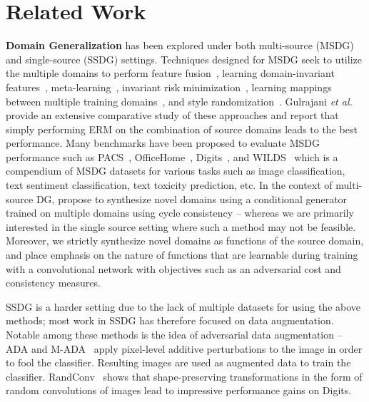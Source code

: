 \section{Related Work}
\textbf{Domain Generalization}
has been explored under both multi-source (MSDG) and single-source (SSDG) settings. Techniques designed for MSDG seek to utilize the multiple domains to perform feature fusion~\citep{shen2019situational}, learning domain-invariant features~\citep{ganin2016domain}, meta-learning~\citep{li2018learning}, invariant risk minimization~\citep{arjovsky2019invariant}, learning mappings between multiple training domains~\citep{robey2021model}, and style randomization~\citep{nam2021reducing}.
Gulrajani  \textit{et al.}~\citep{gulrajani2021in} provide an extensive comparative study of these approaches and report that simply performing ERM on the combination of source domains leads to the best performance. Many benchmarks have been proposed to evaluate MSDG performance such as PACS~\citep{li2017deeper}, OfficeHome~\citep{venkateswara2017deep}, Digits~\citep{volpi2018generalizing}, and WILDS~\citep{koh2021wilds} which is a compendium of MSDG datasets for various tasks such as image classification, text sentiment classification, text toxicity prediction, etc. In the context of multi-source DG, \citep{zhou2020learning} propose to synthesize novel domains using a conditional generator trained on multiple domains using cycle consistency -- whereas we are primarily interested in the single source setting where such a method may not be feasible. Moreover, we strictly synthesize novel domains as functions of the source domain, and place emphasis on the nature of functions that are learnable during training with a convolutional network with objectives such as an adversarial cost and consistency measures.

SSDG is a harder setting due to the lack of multiple datasets for using the above methods; most work in SSDG has therefore focused on data augmentation.
Notable among these methods is the idea of adversarial data augmentation -- ADA\citep{volpi2018generalizing} and M-ADA~\citep{qiao2020learning} apply pixel-level additive perturbations to the image in order to fool the classifier.  Resulting images are used as augmented data to train the classifier.
RandConv~\citep{xu2020robust} shows that shape-preserving transformations in the form of random convolutions of images lead to impressive performance gains on Digits.

